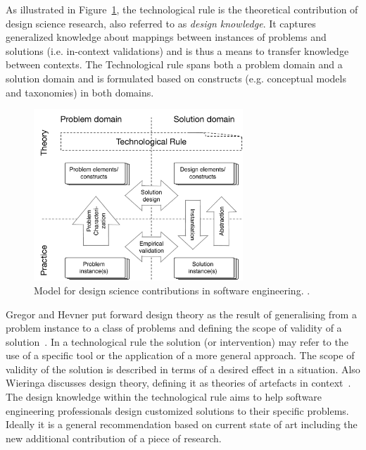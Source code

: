 \documentclass[graybox]{svmult}
\begin{document}
As illustrated in Figure~\ref{fig:DS_model}, the technological rule is the theoretical contribution of design science research, also referred to as \emph{design knowledge}. It captures generalized knowledge about mappings between instances of problems and solutions (i.e. in-context validations) and is thus a means to transfer knowledge between contexts. The Technological rule spans both a problem domain and a solution domain and is formulated based on constructs (e.g. conceptual models and taxonomies) in both domains. 

\begin{figure}
  \includegraphics[width=0.7\textwidth]{Figures/DS_model.pdf}
\caption{Model for design science contributions in software engineering. \cite{engstrom2019}.}
\label{fig:DS_model}       %
\end{figure}

Gregor and Hevner put forward design theory as the result of generalising from a problem instance to a class of problems and defining the scope of validity of a solution~\cite{gregor_positioning_2013}. 
In a technological rule the solution (or intervention) may refer to the use of a specific tool or the application of a more general approach. The scope of validity of the solution is described in terms of a desired effect in a situation.  Also Wieringa discusses design theory, defining it as theories of artefacts in context~\cite{wieringa_design_2009}. The design knowledge within the technological rule aims to help software engineering professionals design customized solutions to their specific problems. Ideally it is a general recommendation based on current state of art including the new additional contribution of a piece of research.
\end{document}
